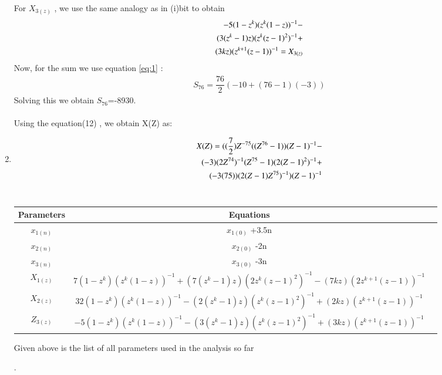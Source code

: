 \documentclass[journal,12pt,twocolumn]{IEEEtran}
\theoremstyle{remark}
\begin{document}
\begin{enumerate}
For $X_{3(z)}$ , we use the same analogy as in (i)bit to obtain \\
\begin{align}
   \notag -5(1-z^k)(z^k(1-z))^{-1}-
   \\ \notag(3(z^k-1)z)(z^k(z-1)^2)^{-1}+\\ (3kz)(z^{k+1}(z-1))^{-1}=X_{3(z)}
\end{align}
Now, for the sum we use equation \eqref{eq:1} :\\
\begin{align}
    S_{76}=\dfrac{76}{2}(-10+(76-1)(-3))
    \end{align}
Solving this we obtain $S_{76}$=-8930.\\\\
 Using the equation(12) , we obtain X(Z) as:\\
 \item 
 \begin{align}
 \notag X(Z) =((\dfrac{7}{2})Z^{-75}((Z^{76}-1))(Z-1)^{-1}-\\
 \notag(-3)(2Z^{74})^{-1}(Z^{75}-1)(2(Z-1)^{2})^{-1}+\\
 \notag(-3(75))(2(Z-1)Z^{75})^{-1})(Z-1)^{-1}
 \end{align}
 \\

 \newpage
 
 \begin{center}
\begin{tabular}{ |c|c|c| } 
 \hline
 Parameters & Equations  \\ 
 \hline
  $x_{1(n)}$ &  $x_{1(0)}$ +3.5n\\
  $x_{2(n)}$ & $x_{2(0)}$ -2n\\
  $x_{3(n)}$ & $x_{3(0)}$ -3n\\
 $X_{1(z)}$ &  $7(1-z^k)(z^k(1-z))^{-1}+
    (7(z^k-1)z)(2z^k(z-1)^2)^{-1}-(7kz)(2z^{k+1}(z-1))^{-1}$\\
 $X_{2(z)}$ &  $32(1-z^k)(z^k(1-z))^{-1}-
    (2(z^k-1)z)(z^k(z-1)^2)^{-1}+(2kz)(z^{k+1}(z-1))^{-1}$  \\ 
$Z_{3(z)}$ &  $-5(1-z^k)(z^k(1-z))^{-1}-
    (3(z^k-1)z)(z^k(z-1)^2)^{-1}+(3kz)(z^{k+1}(z-1))^{-1}$ \\
 \hline
\end{tabular}
\end{center}
\caption{ Given above is the list of all parameters used in the analysis so far}.\\


 






\end{enumerate}



 

 
\end{document}
